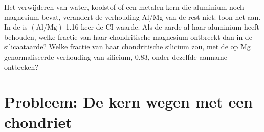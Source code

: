 \begin{exercise}[$\star\star\star$]\label{exo:b2:elements-in-the-earth:12}
Het verwijderen van water, koolstof of een metalen kern die aluminium noch
magnesium bevat, verandert de verhouding Al/Mg van de rest niet: toon het aan. In de  is $(\mathrm{Al}/\mathrm{Mg})$ 1.16 keer de CI-waarde. Als de
aarde al haar aluminium heeft behouden, welke fractie van haar chondritische magnesium
ontbreekt dan in de silicaataarde? Welke fractie van haar chondritische silicium zou, met de op Mg
genormaliseerde verhouding van silicium, 0.83, onder dezelfde aanname
ontbreken?
\end{exercise}

\section{Probleem: De kern wegen met een chondriet}

